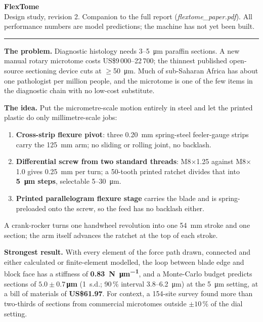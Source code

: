 \documentclass[10pt,a4paper]{article}
\newcommand{\hl}[1]{\textcolor{acc}{\textbf{#1}}}
\begin{document}
{\LARGE\textbf{FlexTome}}\\[2pt]
{\small Design study, revision 2. Companion to the full report (\emph{flextome\_paper.pdf}). All performance numbers are model predictions; the machine has not yet been built.}

\vspace{4pt}\hrule\vspace{6pt}

\begin{minipage}[t]{0.56\linewidth}\vspace{0pt}
\textbf{The problem.} Diagnostic histology needs 3--\SI{5}{\micro\metre} paraffin sections. A new manual rotary microtome costs US\$9\,000--22\,700; the thinnest published open-source sectioning device cuts at $\geq$\SI{50}{\micro\metre}. Much of sub-Saharan Africa has about one pathologist per million people, and the microtome is one of the few items in the diagnostic chain with no low-cost substitute.

\textbf{The idea.} Put the micrometre-scale motion entirely in steel and let the printed plastic do only millimetre-scale jobs:
\begin{enumerate}[nosep,leftmargin=1.2em]
\item \textbf{Cross-strip flexure pivot}: three \SI{0.20}{\milli\metre} spring-steel feeler-gauge strips carry the \SI{125}{\milli\metre} arm; no sliding or rolling joint, no backlash.
\item \textbf{Differential screw from two standard threads}: M8$\times$1.25 against M8$\times$1.0 gives \SI{0.25}{\milli\metre} per turn; a 50-tooth printed ratchet divides that into \hl{\SI{5}{\micro\metre} steps}, selectable 5--\SI{30}{\micro\metre}.
\item \textbf{Printed parallelogram flexure stage} carries the blade and is spring-preloaded onto the screw, so the feed has no backlash either.
\end{enumerate}
A crank-rocker turns one handwheel revolution into one \SI{54}{\milli\metre} stroke and one section; the arm itself advances the ratchet at the top of each stroke.

\textbf{Strongest result.} With every element of the force path drawn, connected and either calculated or finite-element modelled, the loop between blade edge and block face has a stiffness of \hl{\SI{0.83}{\newton\per\micro\metre}}, and a Monte-Carlo budget predicts sections of \hl{$5.0\pm0.7$\,\si{\micro\metre}} (1~s.d.; 90\,\% interval 3.8--\SI{6.2}{\micro\metre}) at the \SI{5}{\micro\metre} setting, at a bill of materials of \hl{US\$61.97}. For context, a 154-site survey found more than two-thirds of sections from commercial microtomes outside $\pm10\,\%$ of the dial setting.
\end{minipage}\hfill
\end{document}
